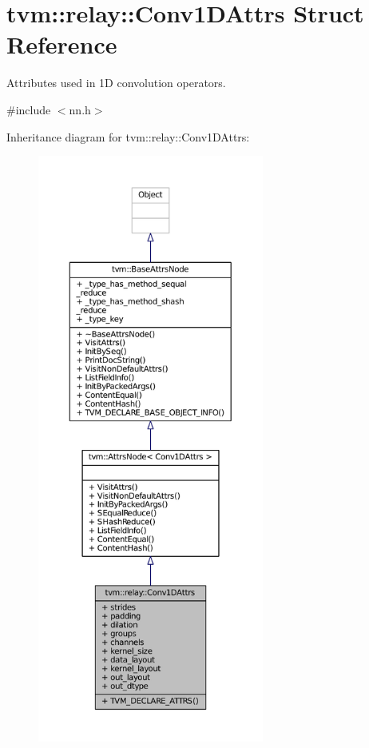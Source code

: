 \hypertarget{structtvm_1_1relay_1_1Conv1DAttrs}{}\section{tvm\+:\+:relay\+:\+:Conv1\+D\+Attrs Struct Reference}
\label{structtvm_1_1relay_1_1Conv1DAttrs}


Attributes used in 1D convolution operators.  




{\ttfamily \#include $<$nn.\+h$>$}



Inheritance diagram for tvm\+:\+:relay\+:\+:Conv1\+D\+Attrs\+:
\nopagebreak
\begin{figure}[H]
\begin{center}
\leavevmode
\includegraphics[height=550pt]{structtvm_1_1relay_1_1Conv1DAttrs__inherit__graph}
\end{center}
\end{figure}


